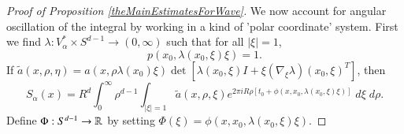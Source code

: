 \begin{proof}[Proof of Proposition \ref{theMainEstimatesForWave}]
We now account for angular oscillation of the integral by working in a kind of 'polar coordinate' system. First we find $\lambda: V_\alpha^* \times S^{d-1} \to (0,\infty)$ such that for all $|\xi| = 1$,
%
\begin{equation}
    p(x_0, \lambda(x_0,\xi) \xi) = 1.
\end{equation}
%
If $\tilde{a}(x,\rho, \eta) = a(x, \rho \lambda(x_0) \xi ) \det [ \lambda(x_0,\xi) I + \xi (\nabla_\xi \lambda)(x_0,\xi)^T ]$, then
%
%
\begin{equation}
    S_\alpha(x) = R^d \int_0^\infty \rho^{d-1} \int_{|\xi| = 1} \tilde{a}(x,\rho, \xi) e^{2 \pi i R \rho [ t_0 + \phi(x, x_0, \lambda(x_0,\xi) \xi) ]}\; d\xi\; d\rho.
\end{equation}
%
Define $\Phi: S^{d-1} \to \operatorname{\mathbb{R}}$ by setting $\Phi(\xi) = \phi(x,x_0, \lambda(x_0,\xi) \xi)$.    
%
%
%
%
%
%
%
%
%
%
%
%
%
%
%
%                

\end{proof}
